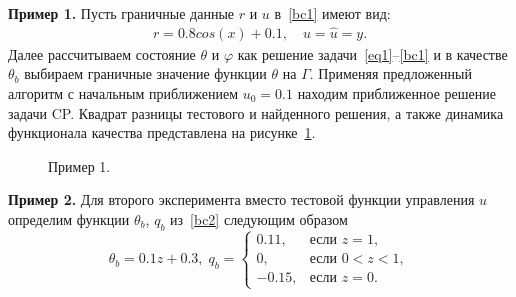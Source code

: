 \documentclass[12pt]{article}
\begin{document}
    \textbf{Пример 1.}
    Пусть граничные данные $r$ и $u$ в~\eqref{bc1} имеют вид:
    \begin{gather*}
        r = 0.8 cos(x) + 0.1,\quad
        u = \hat u = y.
    \end{gather*}
    Далее рассчитываем состояние $\theta$ и $\varphi$ как решение задачи~\eqref{eq1}--\eqref{bc1} и в качестве
    $\theta_b$ выбираем граничные значение функции $\theta$ на $\Gamma$.
    Применяя предложенный алгоритм с начальным приближением $u_0 = 0.1$ находим приближенное решение задачи CP\@.
    Квадрат разницы тестового и найденного решения,
    а также динамика функционала качества представлена на рисунке~\ref{img_test_1}.

    \begin{figure}[H]
        \centering
        \caption{Пример 1.}
        \label{img_test_1}
    \end{figure}

    \textbf{Пример 2.}
    Для второго эксперимента вместо тестовой функции управления $u$
    определим функции $\theta_b$, $q_b$ из~\eqref{bc2} следующим образом
    \[
        \theta_b = 0.1z + 0.3, \;
        q_b =
        \begin{cases}
            0.11, & \text{если } z = 1,\\
            0, & \text{если } 0 < z < 1,\\
            -0.15, & \text{если } z = 0.
        \end{cases}
    \]
\end{document}
